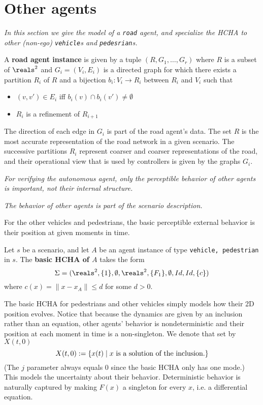 \section{Other agents}
\label{otherAgents}

{\it In this section we give the model of a \texttt{road} agent, and specialize the HCHA to other (non-ego)  \texttt{vehicle}s and \texttt{pedesrian}s.}

\begin{defn}
	\label{def:road}
	A \textbf{road agent instance} is given by a tuple $(R, G_1,\ldots, G_r)$ where 
	$R$ is a subset of $\reals^2$
	and $G_i = (V_i,E_i)$ is a directed graph for which there exists a partition $R_i$ of $R$ and a bijection $b_i: V_i \rightarrow R_i$ between $R_i$ and $V_i$ such that
	\begin{itemize}
		\item  $(v,v') \in E_i$ iff $b_i(v)\cap b_i(v') \neq \emptyset$
		\item $R_i$ is a refinement of $R_{i+1}$
	\end{itemize}
	\end{defn}

The direction of each edge in $G_i$ is part of the road agent's data.
The set $R$ is the most accurate representation of the road network in a given scenario.
The successive partitions $R_i$ represent coarser and coarser representations of the road, and their operational view that is used by controllers is given by the graphs $G_i$.

{\it For verifying the autonomous agent, only the perceptible behavior of other agents is important, not their internal structure.}

{\it The behavior of other agents is part of the scenario description.}

For the other vehicles and pedestrians, the basic perceptible external behavior is their position at given moments in time. 
\begin{defn}
	\label{def:otherAgentsBehavior}
	Let $s$ be a scenario, and let $A$ be an agent instance of type \texttt{vehicle, pedestrian} in $s$.
	The \textbf{basic HCHA of $A$} takes the form 
	\[\Sys = (\reals^2, \{1\}, \emptyset, \reals^2, \{F_1\}, \emptyset, Id, Id, \{c\})\]
	where $c(x) = \|x-x_A\| \leq d$ for some $d > 0$.
	\end{defn}

The basic HCHA for pedestrians and other vehicles simply models how their 2D position evolves. 
Notice that because the dynamics are given by an inclusion rather than an equation, other agents' behavior is nondeterministic and their position at each moment in time is a non-singleton.
We denote that set by $X(t,0)$
\[X(t,0) := \{x(t) \;|\; x \text{ is a solution of the inclusion}.\}\]
(The $j$ parameter always equals 0 since the basic HCHA only has one mode.)
This models the uncertainty about their behavior.
Deterministic behavior is naturally captured by making $F(x)$ a singleton for every $x$, i.e. a differential equation.

